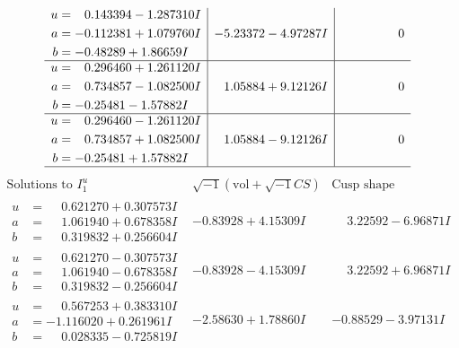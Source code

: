 \documentclass[1p]{elsarticle_modified}
\theoremstyle{definition}
\newcommand{\I}{\sqrt{-1}}
\begin{document}
$$\begin{array}{c|c|c}
\begin{aligned}
u &= \phantom{-}0.143394 - 1.287310 I \\
a &= -0.112381 + 1.079760 I \\
b &= -0.48289 + 1.86659 I\end{aligned}
 & -5.23372 - 4.97287 I & \phantom{-0.000000 } 0 \\ \hline\begin{aligned}
u &= \phantom{-}0.296460 + 1.261120 I \\
a &= \phantom{-}0.734857 - 1.082500 I \\
b &= -0.25481 - 1.57882 I\end{aligned}
 & \phantom{-}1.05884 + 9.12126 I & \phantom{-0.000000 } 0 \\ \hline\begin{aligned}
u &= \phantom{-}0.296460 - 1.261120 I \\
a &= \phantom{-}0.734857 + 1.082500 I \\
b &= -0.25481 + 1.57882 I\end{aligned}
 & \phantom{-}1.05884 - 9.12126 I & \phantom{-0.000000 } 0\\
 \hline 
 \end{array}$$\newpage$$\begin{array}{c|c|c}  
\text{Solutions to }I^u_{1}& \I (\text{vol} + \sqrt{-1}CS) & \text{Cusp shape}\\
 \hline 
\begin{aligned}
u &= \phantom{-}0.621270 + 0.307573 I \\
a &= \phantom{-}1.061940 + 0.678358 I \\
b &= \phantom{-}0.319832 + 0.256604 I\end{aligned}
 & -0.83928 + 4.15309 I & \phantom{-}3.22592 - 6.96871 I \\ \hline\begin{aligned}
u &= \phantom{-}0.621270 - 0.307573 I \\
a &= \phantom{-}1.061940 - 0.678358 I \\
b &= \phantom{-}0.319832 - 0.256604 I\end{aligned}
 & -0.83928 - 4.15309 I & \phantom{-}3.22592 + 6.96871 I \\ \hline\begin{aligned}
u &= \phantom{-}0.567253 + 0.383310 I \\
a &= -1.116020 + 0.261961 I \\
b &= \phantom{-}0.028335 - 0.725819 I\end{aligned}
 & -2.58630 + 1.78860 I & -0.88529 - 3.97131 I \\ \hline\begin{aligned}

\end{aligned}
\end{array}$$
\end{document}
